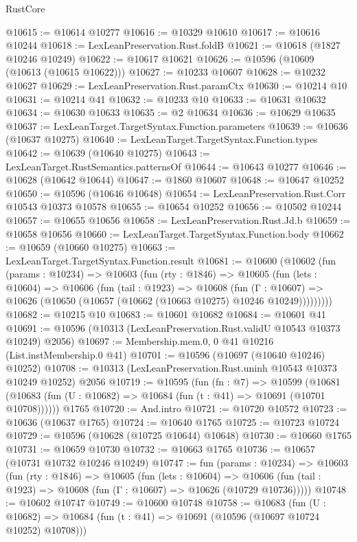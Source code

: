 \begin{lexlean}{RustCore}
\begin{coremodule}
@10615 := @10614 @10277
@10616 := @10329 @10610
@10617 := @10616 @10244
@10618 := LexLeanPreservation.Rust.foldB
@10621 := @10618 (@1827 @10246 @10249)
@10622 := @10617 @10621
@10626 := @10596 (@10609 (@10613 (@10615 @10622)))
@10627 := @10233 @10607
@10628 := @10232 @10627
@10629 := LexLeanPreservation.Rust.paramCtx
@10630 := @10214 @10
@10631 := @10214 @41
@10632 := @10233 @10
@10633 := @10631 @10632
@10634 := @10630 @10633
@10635 := @2 @10634
@10636 := @10629 @10635
@10637 := LexLeanTarget.TargetSyntax.Function.parameters
@10639 := @10636 (@10637 @10275)
@10640 := LexLeanTarget.TargetSyntax.Function.types
@10642 := @10639 (@10640 @10275)
@10643 := LexLeanTarget.RustSemantics.patternsOf
@10644 := @10643 @10277
@10646 := @10628 (@10642 @10644)
@10647 := @1860 @10607
@10648 := @10647 @10252
@10650 := @10596 (@10646 @10648)
@10654 := LexLeanPreservation.Rust.Corr @10543 @10373 @10578
@10655 := @10654 @10252
@10656 := @10502 @10244
@10657 := @10655 @10656
@10658 := LexLeanPreservation.Rust.Jd.b
@10659 := @10658 @10656
@10660 := LexLeanTarget.TargetSyntax.Function.body
@10662 := @10659 (@10660 @10275)
@10663 := LexLeanTarget.TargetSyntax.Function.result
@10681 := @10600
    (@10602
      (fun (params : @10234) =>
      @10603
        (fun (rty : @1846) =>
        @10605
          (fun (lets : @10604) =>
          @10606
            (fun (tail : @1923) =>
            @10608
              (fun (Γ : @10607) =>
              @10626 (@10650 (@10657 (@10662 (@10663 @10275) @10246 @10249)))))))))
@10682 := @10215 @10
@10683 := @10601 @10682
@10684 := @10601 @41
@10691 := @10596 (@10313 (LexLeanPreservation.Rust.validU @10543 @10373 @10249) @2056)
@10697 := Membership.mem.{0, 0} @41 @10216 (List.instMembership.{0} @41)
@10701 := @10596 (@10697 (@10640 @10246) @10252)
@10708 := @10313 (LexLeanPreservation.Rust.uninh @10543 @10373 @10249 @10252) @2056
@10719 := @10595
    (fun (fn : @7) =>
    @10599 (@10681 (@10683 (fun (U : @10682) => @10684 (fun (t : @41) => @10691 (@10701 @10708))))))
    @1765
@10720 := And.intro
@10721 := @10720 @10572
@10723 := @10636 (@10637 @1765)
@10724 := @10640 @1765
@10725 := @10723 @10724
@10729 := @10596 (@10628 (@10725 @10644) @10648)
@10730 := @10660 @1765
@10731 := @10659 @10730
@10732 := @10663 @1765
@10736 := @10657 (@10731 @10732 @10246 @10249)
@10747 := fun (params : @10234) =>
  @10603
    (fun (rty : @1846) =>
    @10605
      (fun (lets : @10604) =>
      @10606 (fun (tail : @1923) => @10608 (fun (Γ : @10607) => @10626 (@10729 @10736)))))
@10748 := @10602 @10747
@10749 := @10600 @10748
@10758 := @10683
    (fun (U : @10682) => @10684 (fun (t : @41) => @10691 (@10596 (@10697 @10724 @10252) @10708)))

\end{coremodule}
\end{lexlean}
